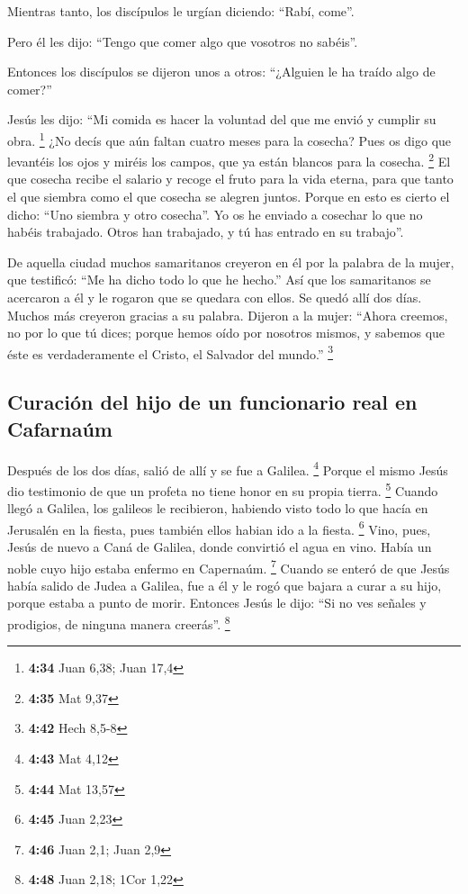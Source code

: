  Mientras tanto, los discípulos le urgían diciendo:
``Rabí, come''.

 Pero él les dijo: ``Tengo que comer algo que vosotros no
sabéis''.

 Entonces los discípulos se dijeron unos a otros:
``¿Alguien le ha traído algo de comer?''

 Jesús les dijo: ``Mi comida es hacer la voluntad del que
me envió y cumplir su obra. \footnote{\textbf{4:34} Juan 6,38; Juan 17,4}
 ¿No decís que aún faltan cuatro meses para la cosecha?
Pues os digo que levantéis los ojos y miréis los campos, que ya están
blancos para la cosecha. \footnote{\textbf{4:35} Mat 9,37}
 El que cosecha recibe el salario y recoge el fruto para
la vida eterna, para que tanto el que siembra como el que cosecha se
alegren juntos.  Porque en esto es cierto el dicho: ``Uno
siembra y otro cosecha''.  Yo os he enviado a cosechar lo
que no habéis trabajado. Otros han trabajado, y tú has entrado en su
trabajo''.

 De aquella ciudad muchos samaritanos creyeron en él por
la palabra de la mujer, que testificó: ``Me ha dicho todo lo que he
hecho.''  Así que los samaritanos se acercaron a él y le
rogaron que se quedara con ellos. Se quedó allí dos días.
 Muchos más creyeron gracias a su palabra.
 Dijeron a la mujer: ``Ahora creemos, no por lo que tú
dices; porque hemos oído por nosotros mismos, y sabemos que éste es
verdaderamente el Cristo, el Salvador del mundo.'' \footnote{\textbf{4:42}
  Hech 8,5-8}

\hypertarget{curaciuxf3n-del-hijo-de-un-funcionario-real-en-cafarnauxfam}{%
\subsection{Curación del hijo de un funcionario real en
Cafarnaúm}\label{curaciuxf3n-del-hijo-de-un-funcionario-real-en-cafarnauxfam}}

 Después de los dos días, salió de allí y se fue a
Galilea. \footnote{\textbf{4:43} Mat 4,12}  Porque el
mismo Jesús dio testimonio de que un profeta no tiene honor en su propia
tierra. \footnote{\textbf{4:44} Mat 13,57}  Cuando llegó
a Galilea, los galileos le recibieron, habiendo visto todo lo que hacía
en Jerusalén en la fiesta, pues también ellos habian ido a la fiesta.
\footnote{\textbf{4:45} Juan 2,23}  Vino, pues, Jesús de
nuevo a Caná de Galilea, donde convirtió el agua en vino. Había un noble
cuyo hijo estaba enfermo en Capernaúm. \footnote{\textbf{4:46} Juan 2,1;
  Juan 2,9}  Cuando se enteró de que Jesús había salido
de Judea a Galilea, fue a él y le rogó que bajara a curar a su hijo,
porque estaba a punto de morir.  Entonces Jesús le dijo:
``Si no ves señales y prodigios, de ninguna manera creerás''.
\footnote{\textbf{4:48} Juan 2,18; 1Cor 1,22}


